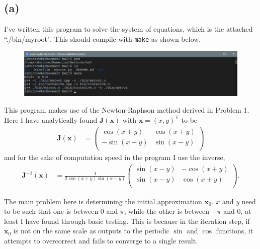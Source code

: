 \documentclass[12pt]{article}
\begin{document}
\subsection*{(a)}

I've written this program to solve the system of equations, which is the
attached ``./bin/myroot". This should compile with \texttt{make} as shown
below.

\begin{figure}[H]
    \centering
    \includegraphics[width=1.0\textwidth]{compile}
    \label{fig:compile}
\end{figure}

This program makes use of the Newton-Raphson method derived in Problem 1. Here
I have analytically found $\boldsymbol{J}(\boldsymbol{x})$ with
$\boldsymbol{x} = (x, y)^\mathsf{T}$ to be
$$
\begin{aligned}
\boldsymbol{J}(\boldsymbol{x})
&=
\begin{pmatrix}
\cos(x + y) & \cos(x + y) \\
-\sin(x - y) & \sin(x - y) \\
\end{pmatrix}
\end{aligned}
$$
and for the sake of computation speed in the program I use the inverse,
$$
\begin{aligned}
\boldsymbol{J}^{-1}(\boldsymbol{x})
&= \frac{1}{2 \cos(x + y) \sin(x - y)}
\begin{pmatrix}
\sin(x - y) & -\cos(x + y) \\
\sin(x - y) & \cos(x + y) \\
\end{pmatrix}.
\end{aligned}
$$

The main problem here is determining the initial approximation
$\boldsymbol{x}_0$. $x$ and $y$ need to be such that one is between 0 and
$\pi$, while the other is between $-\pi$ and 0, at least I have found through
basic testing. This is because in the iteration step, if $\boldsymbol{x}_0$ is
not on the same scale as outputs to the periodic $\sin$ and $\cos$ functions,
it attempts to overcorrect and fails to converge to a single result.
\end{document}
